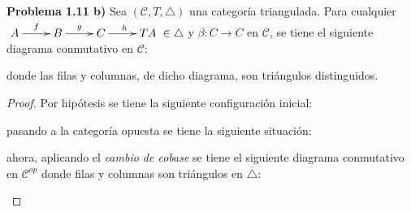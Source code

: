 \documentclass{article}
\newcommand{\cc}{\mathscr{C}}
\begin{document}
\begin{enumerate}

\textbf{Problema 1.11 b)} Sea $(\cc,T,\triangle)$ una categor\'ia triangulada. Para cualquier 
$\xymatrix{A\ar[r]^f & B\ar[r]^g & C\ar[r]^h & TA }\in \triangle$ y $\beta:C\to C$ en $\cc$, se tiene el siguiente diagrama conmutativo en $\cc$:

\begin{center}
\end{center}
donde las filas y columnas, de dicho diagrama, son triángulos distinguidos.

\begin{proof}
Por hipótesis se tiene la siguiente configuración inicial:

\begin{center}
\end{center}

pasando a la categoría opuesta se tiene la siguiente situación:

\begin{center}
\end{center}

ahora, aplicando el \emph{cambio de cobase} se tiene el siguiente diagrama conmutativo en $\cc^{op}$ donde filas y columnas son triángulos en $\overline{\triangle}$:

\begin{center}
\end{center}


\end{proof}
\end{enumerate}
\end{document}
